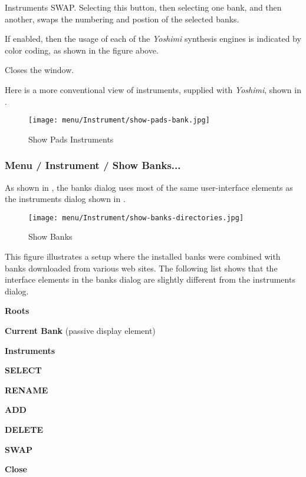    Instruments SWAP.
   Selecting this button, then selecting one bank, and then another,
   swaps the numbering and postion of the selected banks.

   If enabled, then the usage of each of the \textsl{Yoshimi} synthesis
   engines is indicated by color coding, as shown in the figure above.

   Closes the window.

   Here is a more conventional view of instruments, supplied with
   \textsl{Yoshimi}, shown in
   .

\begin{figure}[H]
   \centering 
   \texttt{[image: menu/Instrument/show-pads-bank.jpg]}
   \caption[Show Pads Instruments]{Show Pads Instruments}
   \label{fig:show_pads_bank}
\end{figure}

\subsubsection{Menu / Instrument / Show Banks...}
\label{subsubsec:menu_instrument_show_banks}

   As shown in
   ,
   the banks dialog uses most of the same
   user-interface elements as the instruments dialog shown in
   .

\begin{figure}[H]
   \centering 
   \texttt{[image: menu/Instrument/show-banks-directories.jpg]}
   \caption[Show Banks]{Show Banks}
   \label{fig:show_banks_directories}
\end{figure}

   This figure illustrates a setup where the installed banks were combined with
   banks downloaded from various web sites.
   The following list shows that the interface elements in the banks dialog
   are slightly different from the instruments dialog.

   \begin{enumber}
      \item \textbf{Roots}
      \item \textbf{Current Bank} (passive display element)
      \item \textbf{Instruments}
      \item \textbf{SELECT}
      \item \textbf{RENAME}
      \item \textbf{ADD}
      \item \textbf{DELETE}
      \item \textbf{SWAP}
      \item \textbf{Close}
   \end{enumber}

